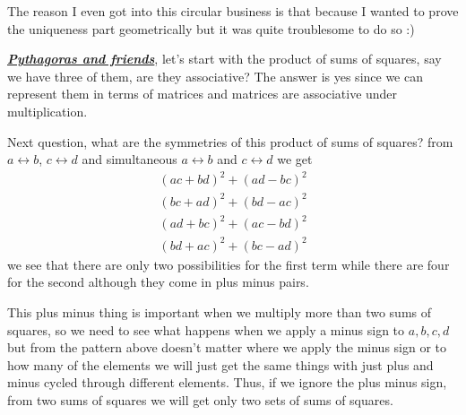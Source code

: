 \documentclass[aps,preprint,preprintnumbers,nofootinbib,showpacs,prd]{revtex4-1}
\newcommand{\nbea}{\begin{eqnarray*}}
\newcommand{\neea}{\end{eqnarray*}}
\begin{document}
The reason I even got into this circular business is that because I wanted to prove the uniqueness part geometrically but it was quite troublesome to do so :)

\underline{\textit{\textbf{Pythagoras and friends}}}, let's start with the product of sums of squares, say we have three of them, are they associative? The answer is yes since we can represent them in terms of matrices and matrices are associative under multiplication.

Next question, what are the symmetries of this product of sums of squares? from $a\leftrightarrow b$, $c\leftrightarrow d$ and simultaneous $a\leftrightarrow b$ and $c\leftrightarrow d$ we get
%
\nbea
(ac + bd)^2 + (ad - bc)^2 \\
(bc + ad)^2 + (bd - ac)^2 \\
(ad + bc)^2 + (ac - bd)^2 \\
(bd + ac)^2 + (bc - ad)^2
\neea
%
we see that there are only two possibilities for the first term while there are four for the second although they come in plus minus pairs.

This plus minus thing is important when we multiply more than two sums of squares, so we need to see what happens when we apply a minus sign to $a,b,c,d$ but from the pattern above doesn't matter where we apply the minus sign or to how many of the elements we will just get the same things with just plus and minus cycled through different elements. Thus, if we ignore the plus minus sign, from two sums of squares we will get only two sets of sums of squares.
\end{document}
